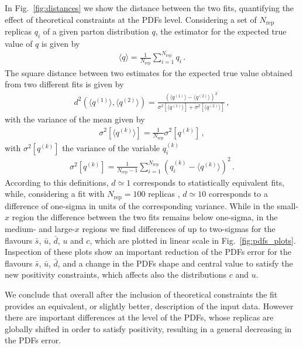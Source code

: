 %
In Fig.~\ref{fig:distances} we show the distance between the two fits, quantifying the effect of theoretical
constraints at the PDFs level.
Considering a set of $N_{\text{rep}}$ replicas $q_i$ of a given parton distribution $q$, the estimator for 
the expected true value of $q$ is given by
\begin{align}
    \langle q \rangle = \frac{1}{N_{\text{rep}}}\sum_{i=1}^{N_{\text{rep}}}q_i\,.
\end{align}
The square distance between two estimates for the expected true value obtained from two different fits
is given by \cite{Ball:2010de}
\begin{align}
    d^2\left(\langle q^{(1)} \rangle, \langle q^{(2)} \rangle\right) = 
    \frac{\left(\langle q^{(1)} \rangle - \langle q^{(2)} \rangle\right)^2}{\sigma^2\left[\langle q^{(1)} \rangle\right]
    + \sigma^2\left[\langle q^{(2)} \rangle\right]}\,,
\end{align}
with the variance of the mean given by 
\begin{align}
    \sigma^2\left[\langle q^{(k)} \rangle\right] = \frac{1}{N_{\text{rep}}}\sigma^2\left[q^{(k)}\right]\,,
\end{align}
with $\sigma^2\left[q^{(k)}\right]$ the variance of the variable $q^{(k)}_i$
\begin{align}
    \label{eq:}
    \sigma^2\left[q^{(k)}\right] = \frac{1}{N_{\text{rep}}-1}\sum_{i=1}^{N_{\text{rep}}}
    \left(q^{(k)}_i - \langle q^{(k)} \rangle\right)^2\,.
\end{align}
According to this definitions, $ d \simeq 1 $ corresponds to statistically equivalent fits, while, considering 
a fit with $N_{\text{rep}} = 100$ replicas , 
$d \simeq 10 $ corresponds to a difference of one-sigma in units of the corresponding variance.
While in the small-$x$ region the difference between the two fits remains below 
one-sigma, in the medium- and large-$x$ regions we find differences of up to
two-sigmas for the flavours $\bar{s}$, $\bar{u}$, $\bar{d}$, $u$ and $c$, 
which are plotted in linear scale in Fig.~\ref{fig:pdfs_plots}.
Inspection of these plots show an important reduction of the PDFs error for the flavours $\bar{s}$, $\bar{u}$, $\bar{d}$,
and a change in the PDFs shape and central value to satisfy the new positivity constraints, which affects also the distributions
$c$ and $u$.

%
We conclude that overall after the inclusion of theoretical constraints the fit provides an equivalent,
or slightly better, description of the input data. However there are important differences at the level of the PDFs,
whose replicas are globally shifted in order to satisfy positivity, resulting in a general decreasing in the PDFs error.



